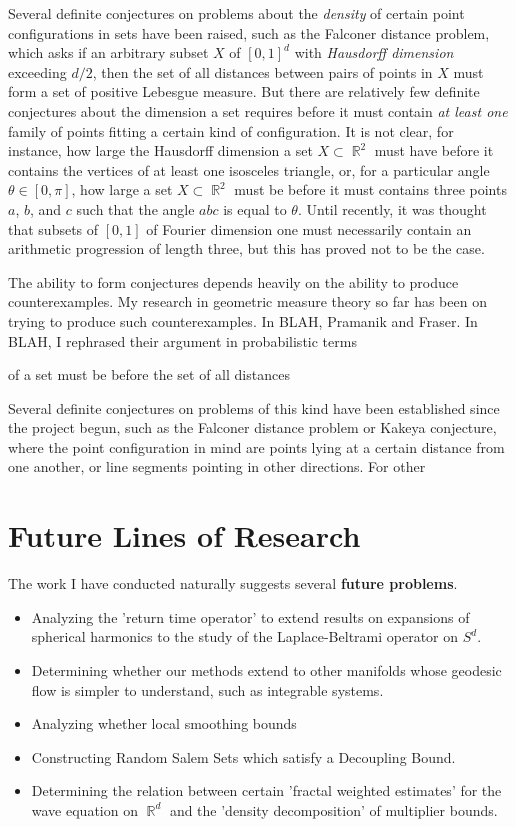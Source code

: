 \documentclass[12pt]{article}
\DeclareMathOperator{\RR}{\mathbb{R}}
\begin{document}
Several definite conjectures on problems about the \emph{density} of certain point configurations in sets have been raised, such as the Falconer distance problem, which asks if an arbitrary subset $X$ of $[0,1]^d$ with \emph{Hausdorff dimension} exceeding $d/2$, then the set of all distances between pairs of points in $X$ must form a set of positive Lebesgue measure. But there are relatively few definite conjectures about the dimension a set requires before it must contain \emph{at least one} family of points fitting a certain kind of configuration. It is not clear, for instance, how large the Hausdorff dimension a set $X \subset \RR^2$ must have before it contains the vertices of at least one isosceles triangle, or, for a particular angle $\theta \in [0,\pi]$, how large a set $X \subset \RR^2$ must be before it must contains three points $a$, $b$, and $c$ such that the angle $abc$ is equal to $\theta$. Until recently, it was thought that subsets of $[0,1]$ of Fourier dimension one must necessarily contain an arithmetic progression of length three, but this has proved not to be the case.

The ability to form conjectures depends heavily on the ability to produce counterexamples. My research in geometric measure theory so far has been on trying to produce such counterexamples. In BLAH, Pramanik and Fraser. In BLAH, I rephrased their argument in probabilistic terms 

 of a set must be before the set of all distances 

Several definite conjectures on problems of this kind have been established since the project begun, such as the Falconer distance problem or Kakeya conjecture, where the point configuration in mind are points lying at a certain distance from one another, or line segments pointing in other directions. For other

\section*{Future Lines of Research}

The work I have conducted naturally suggests several {\bf future problems}.
%
\begin{itemize}
	\item Analyzing the 'return time operator' to extend results on expansions of spherical harmonics to the study of the Laplace-Beltrami operator on $S^d$.

	\item Determining whether our methods extend to other manifolds whose geodesic flow is simpler to understand, such as integrable systems.

	\item Analyzing whether local smoothing bounds

	\item Constructing Random Salem Sets which satisfy a Decoupling Bound.

	\item Determining the relation between certain 'fractal weighted estimates' for the wave equation on $\RR^d$ and the 'density decomposition' of multiplier bounds.
\end{itemize}
\end{document}
